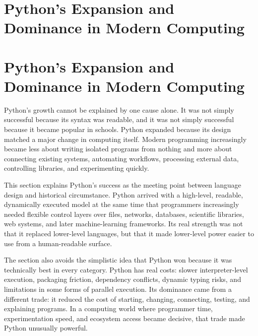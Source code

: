 \section{Python's Expansion and Dominance in Modern Computing}

\section{Python's Expansion and Dominance in Modern Computing}

Python's growth cannot be explained by one cause alone. It was not simply successful because its syntax was readable, and it was not simply successful because it became popular in schools. Python expanded because its design matched a major change in computing itself. Modern programming increasingly became less about writing isolated programs from nothing and more about connecting existing systems, automating workflows, processing external data, controlling libraries, and experimenting quickly.

This section explains Python's success as the meeting point between language design and historical circumstance. Python arrived with a high-level, readable, dynamically executed model at the same time that programmers increasingly needed flexible control layers over files, networks, databases, scientific libraries, web systems, and later machine-learning frameworks. Its real strength was not that it replaced lower-level languages, but that it made lower-level power easier to use from a human-readable surface.

The section also avoids the simplistic idea that Python won because it was technically best in every category. Python has real costs: slower interpreter-level execution, packaging friction, dependency conflicts, dynamic typing risks, and limitations in some forms of parallel execution. Its dominance came from a different trade: it reduced the cost of starting, changing, connecting, testing, and explaining programs. In a computing world where programmer time, experimentation speed, and ecosystem access became decisive, that trade made Python unusually powerful.